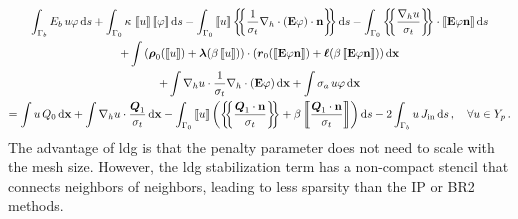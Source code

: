 \documentclass[../doc.tex]{subfiles}
\begin{document}
	\begin{multline} \label{dgvef:ldg}
		\int_{\Gamma_b} E_b\, u \varphi \ud s + \int_{\Gamma_0} \kappa\, \jump{u}\jump{\varphi} \ud s - \int_{\Gamma_0} \jump{u} \avg{\frac{1}{\sigma_t}\nablah\cdot\paren{\E\varphi}\cdot\n} \ud s - \int_{\Gamma_0} \avg{\frac{\nablah u}{\sigma_t}} \cdot \jump{\E\varphi\n} \ud s \\
		+ \int \paren{\vec{\rho}_0\!\paren{\jump{u}} + \vec{\lambda}\!\paren{\beta\jump{u}}}\cdot\paren{\vec{r}_0\!\paren{\jump{\E\varphi\n}} + \vec{\ell}\!\paren{\beta\jump{\E\varphi\n}}} \ud \x \\+ \int \nablah u \cdot \frac{1}{\sigma_t}\nablah\cdot\paren{\E\varphi} \ud \x + \int \sigma_a\, u \varphi \ud \x 
		\\= \int u\, Q_0 \ud \x + \int \nablah u \cdot \frac{\vec{Q}_1}{\sigma_t} \ud \x - \int_{\Gamma_0} \jump{u} \paren{\avg{\frac{\vec{Q}_1\cdot\n}{\sigma_t}} + \beta\jump{\frac{\vec{Q}_1\cdot\n}{\sigma_t}}} \ud s - 2\int_{\Gamma_b} u\, \Jin \ud s \,, \quad \forall u \in Y_p \,. 
	\end{multline}
The advantage of \gls{ldg} is that the penalty parameter does not need to scale with the mesh size. However, the \gls{ldg} stabilization term has a non-compact stencil that connects neighbors of neighbors, leading to less sparsity than the IP or BR2 methods. 
\end{document}
